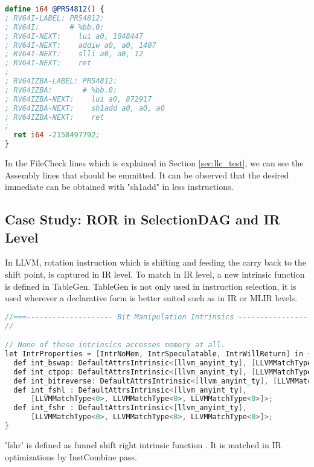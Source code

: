 \begin{lstlisting}[language=llvm,style=nasm, caption={Function for Immediate Materialisation}]
define i64 @PR54812() {
; RV64I-LABEL: PR54812:
; RV64I:       # %bb.0:
; RV64I-NEXT:    lui a0, 1048447
; RV64I-NEXT:    addiw a0, a0, 1407
; RV64I-NEXT:    slli a0, a0, 12
; RV64I-NEXT:    ret
;
; RV64IZBA-LABEL: PR54812:
; RV64IZBA:       # %bb.0:
; RV64IZBA-NEXT:    lui a0, 872917
; RV64IZBA-NEXT:    sh1add a0, a0, a0
; RV64IZBA-NEXT:    ret
;
  ret i64 -2158497792;
}
\end{lstlisting}
In the FileCheck lines which is explained in Section \ref{sec:llc_test}, we can see the Assembly lines that should be emmitted. It can be observed that the desired immediate can be obtained with "sh1add" in less instructions.

\subsection{Case Study: ROR in SelectionDAG and IR Level}
In LLVM, rotation instruction which is shifting and feeding the carry back to the shift point, is captured in IR level. To match in IR level, a new intrinsic function is defined in TableGen. TableGen is not only used in instruction selection, it is used wherever a declarative form is better suited such as in IR or MLIR levels.

\begin{lstlisting}[language=C++, caption={Funnel Shift Intrinsic Definition}]
//===-------------------- Bit Manipulation Intrinsics ---------------------===//
//

// None of these intrinsics accesses memory at all.
let IntrProperties = [IntrNoMem, IntrSpeculatable, IntrWillReturn] in {
  def int_bswap: DefaultAttrsIntrinsic<[llvm_anyint_ty], [LLVMMatchType<0>]>;
  def int_ctpop: DefaultAttrsIntrinsic<[llvm_anyint_ty], [LLVMMatchType<0>]>;
  def int_bitreverse: DefaultAttrsIntrinsic<[llvm_anyint_ty], [LLVMMatchType<0>]>;
  def int_fshl : DefaultAttrsIntrinsic<[llvm_anyint_ty],
      [LLVMMatchType<0>, LLVMMatchType<0>, LLVMMatchType<0>]>;
  def int_fshr : DefaultAttrsIntrinsic<[llvm_anyint_ty],
      [LLVMMatchType<0>, LLVMMatchType<0>, LLVMMatchType<0>]>;
}
\end{lstlisting}

'fshr' is defined as funnel shift right intrinsic function \cite{llvmref-fshl}. It is matched in IR optimizations by InstCombine pass.

